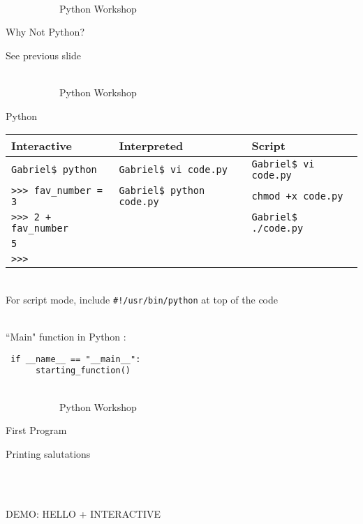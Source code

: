 \documentclass[10pt, xcolor=dvisnames]{beamer}
\begin{document}
\begin{frame}{{\tiny \ \\\vspace{-13pt} \ \ \ \ \ \ \ \ \ \ \ Python Workshop}\\ \centerline{Why Not Python?}}
\vspace*{-50pt}

See previous slide


\end{frame}



\begin{frame}{{\tiny \ \\\vspace{-13pt} \ \ \ \ \ \ \ \ \ \ \ Python Workshop}\\ \centerline{Python}}
\vspace*{-50pt}

{\small
\begin{tabular}{lll}
Interactive & Interpreted & Script\\
\hline
\texttt{Gabriel\$ python} & \texttt{Gabriel\$ vi code.py}& \texttt{Gabriel\$ vi code.py}\\
\texttt{>>> fav\_number = 3} & \texttt{Gabriel\$ python code.py} & \texttt{chmod +x code.py}\\
\texttt{>>> 2 + fav\_number} & & \texttt{Gabriel\$ ./code.py} \\
\texttt{5}\\
\texttt{>>>}\\
\end{tabular}
}

\ \\
For script mode, include \texttt{\#!/usr/bin/python} at top of the code

\ \\
``Main" function in Python : 

\texttt{
if \_\_name\_\_ == "\_\_main\_\_":\\
\ \ \ \ \ \ starting\_function()
}





\end{frame}



\begin{frame}{{\tiny \ \\\vspace{-13pt} \ \ \ \ \ \ \ \ \ \ \ Python Workshop}\\ \centerline{First Program}}
\vspace*{-50pt}

Printing salutations

\ \\
\ \\
\centerline{DEMO: HELLO + INTERACTIVE}

\end{frame}
\end{document}
